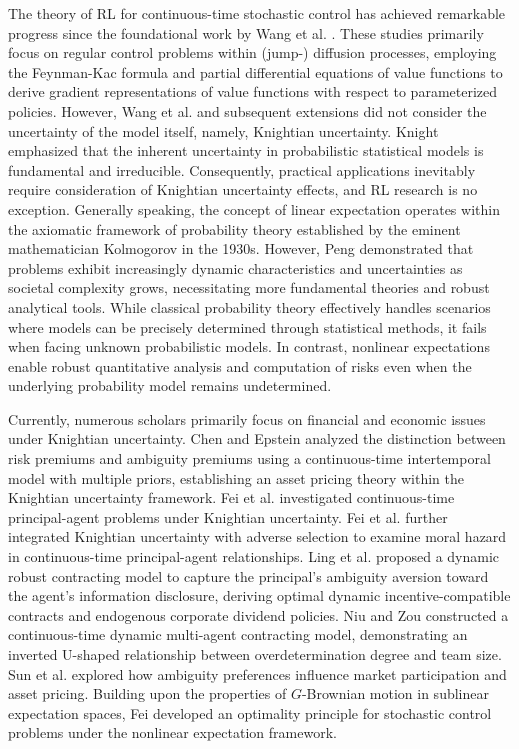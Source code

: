 \documentclass[onecolumn, journal]{IEEEtran} %
\begin{document}
	The theory of RL for continuous-time stochastic control has achieved remarkable progress since the foundational work by Wang et al. \cite{wang2020reinforcement}. These studies primarily focus on regular control problems within (jump-) diffusion processes, employing the Feynman-Kac formula and partial differential equations of value functions to derive gradient representations of value functions with respect to parameterized policies. However, Wang et al. \cite{wang2020reinforcement} and subsequent extensions did not consider the uncertainty of the model itself, namely, Knightian uncertainty. Knight \cite{knight1921risk} emphasized that the inherent uncertainty in probabilistic statistical models is fundamental and irreducible. Consequently, practical applications inevitably require consideration of Knightian uncertainty effects, and RL research is no exception. Generally speaking, the concept of linear expectation operates within the axiomatic framework of probability theory established by the eminent mathematician Kolmogorov in the 1930s. However, Peng \cite{peng2010nonlinear} demonstrated that problems exhibit increasingly dynamic characteristics and uncertainties as societal complexity grows, necessitating more fundamental theories and robust analytical tools. While classical probability theory effectively handles scenarios where models can be precisely determined through statistical methods, it fails when facing unknown probabilistic models. In contrast, nonlinear expectations enable robust quantitative analysis and computation of risks even when the underlying probability model remains undetermined.
	
	Currently, numerous scholars primarily focus on financial and economic issues under Knightian uncertainty. Chen and Epstein \cite{chen2002ambiguity} analyzed the distinction between risk premiums and ambiguity premiums using a continuous-time intertemporal model with multiple priors, establishing an asset pricing theory within the Knightian uncertainty framework. Fei et al. \cite{fei2019dynamics} investigated continuous-time principal-agent problems under Knightian uncertainty. Fei et al. \cite{fei2020contract} further integrated Knightian uncertainty with adverse selection to examine moral hazard in continuous-time principal-agent relationships. Ling et al. \cite{ling2022robust} proposed a dynamic robust contracting model to capture the principal’s ambiguity aversion toward the agent’s information disclosure, deriving optimal dynamic incentive-compatible contracts and endogenous corporate dividend policies. Niu and Zou \cite{niu2024robust} constructed a continuous-time dynamic multi-agent contracting model, demonstrating an inverted U-shaped relationship between overdetermination degree and team size. Sun et al. \cite{sun2023impact} explored how ambiguity preferences influence market participation and asset pricing. Building upon the properties of $G$-Brownian motion in sublinear expectation spaces, Fei \cite{chen2021optimal} developed an optimality principle for stochastic control problems under the nonlinear expectation framework. 
	
\end{document}
